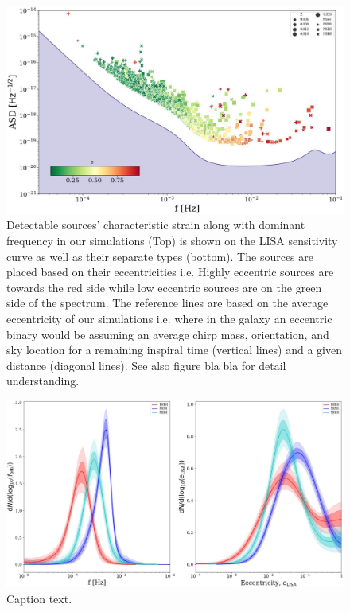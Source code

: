 \documentclass[journal, twocolumn]{IEEEtran}
\begin{document}
    \begin{figure}[!h]
        \centering
        \includegraphics[width=\columnwidth]{images/first}
        \caption{\label{first}Detectable sources' characteristic strain along with dominant frequency in our simulations (Top) is shown on the LISA sensitivity curve as well as their separate types (bottom). The sources are placed based on their eccentricities i.e. Highly eccentric sources are towards the red side while low eccentric sources are on the green side of the spectrum. The reference lines are based on the average eccentricity of our simulations i.e. where in the galaxy an eccentric binary would be assuming an average chirp mass, orientation, and sky location for a remaining inspiral time (vertical lines) and a given distance (diagonal lines). See also figure bla bla for detail understanding.}\label{detect} %
    \end{figure}
    \begin{figure}
        \includegraphics[width=\columnwidth]{images/second}
        \caption{Caption text.}\label{fig:freq} %
    \end{figure}
\end{document}
